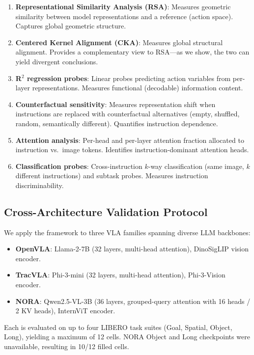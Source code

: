 \documentclass[letterpaper]{article}
\begin{document}
\begin{enumerate}
    \item \textbf{Representational Similarity Analysis (RSA)}: Measures geometric similarity between model representations and a reference (action space). Captures global geometric structure.
    \item \textbf{Centered Kernel Alignment (CKA)}: Measures global structural alignment. Provides a complementary view to RSA---as we show, the two can yield divergent conclusions.
    \item \textbf{R$^2$ regression probes}: Linear probes predicting action variables from per-layer representations. Measures functional (decodable) information content.
    \item \textbf{Counterfactual sensitivity}: Measures representation shift when instructions are replaced with counterfactual alternatives (empty, shuffled, random, semantically different). Quantifies instruction dependence.
    \item \textbf{Attention analysis}: Per-head and per-layer attention fraction allocated to instruction vs.\ image tokens. Identifies instruction-dominant attention heads.
    \item \textbf{Classification probes}: Cross-instruction $k$-way classification (same image, $k$ different instructions) and subtask probes. Measures instruction discriminability.
\end{enumerate}

\subsection{Cross-Architecture Validation Protocol}
\label{sec:protocol}

We apply the framework to three VLA families spanning diverse LLM backbones:

\begin{itemize}
    \item \textbf{OpenVLA}: Llama-2-7B (32 layers, multi-head attention), DinoSigLIP vision encoder.
    \item \textbf{TracVLA}: Phi-3-mini (32 layers, multi-head attention), Phi-3-Vision encoder.
    \item \textbf{NORA}: Qwen2.5-VL-3B (36 layers, grouped-query attention with 16 heads / 2 KV heads), InternViT encoder.
\end{itemize}

Each is evaluated on up to four LIBERO task suites (Goal, Spatial, Object, Long), yielding a maximum of 12 cells.
NORA Object and Long checkpoints were unavailable, resulting in 10/12 filled cells.
\end{document}

